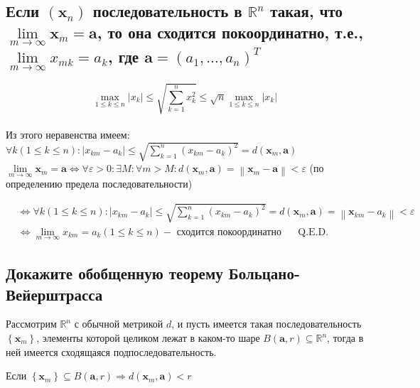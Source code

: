 \documentclass[a4paper]{article}
\begin{document}
\subsection{Если $\left(\mathbf{x}_{n}\right)$ последовательность в $\mathbb{R}^{n}$ такая, что $\lim\limits_{m \rightarrow \infty} \mathbf{x}_{m}=\mathbf{a}$, то она сходится покоординатно, т.е., $\lim\limits_{m \rightarrow \infty} x_{m k}=a_{k}$, где $\mathbf{a}=\left(a_{1}, \ldots, a_{n}\right)^{T}$}

$$\boxed{
\max _{1 \leqslant k \leqslant n}\left|x_{k}\right| \leqslant \sqrt{\sum_{k=1}^{n} x_{k}^{2}} \leqslant \sqrt{n} \max _{1 \leqslant k \leqslant n}\left|x_{k}\right|}$$\\[2mm]
Из этого неравенства имеем: $\forall k(1 \leqslant k \leqslant n):\left|x_{k m}-a_{k}\right| \leqslant \sqrt{\sum_{k=1}^{n}\left(x_{k m}-a_{k}\right)^{2}}=d\left(\mathbf{x}_{m}, \mathbf{a}\right)$\\[2mm]
$\lim\limits_{m \rightarrow \infty} \mathbf{x}_{m}=\mathbf{a} \Longleftrightarrow \forall \varepsilon>0: \exists M: \forall m>M: d\left(\mathbf{x}_{m}, \mathbf{a}\right)=\left\|\mathbf{x}_{m}-\mathbf{a}\right\|<\varepsilon$ (по определению предела последовательности)

$$
\begin{aligned}
& \Longleftrightarrow \forall k(1 \leqslant k \leqslant n):\left|x_{k m}-a_{k}\right| \leqslant \sqrt{\sum_{k=1}^{n}\left(x_{k m}-a_{k}\right)^{2}}=d\left(\mathbf{x}_{m}, \mathbf{a}\right)=\left\|\mathbf{x}_{k m}-a_{k}\right\|<\varepsilon \\
& \Longleftrightarrow \lim\limits_{m \rightarrow \infty} x_{k m}=a_{k}(1 \leqslant k \leqslant n)-\text { сходится покоординатно } \quad \text { Q.E.D. }
\end{aligned}
$$

\subsection{Докажите обобщенную теорему Больцано-Вейерштрасса}

Рассмотрим $\mathbb{R}^{n}$ с обычной метрикой $d$, и пусть имеется такая последовательность $\left\{\mathbf{x}_{m}\right\}$, элементы которой целиком лежат в каком-то шаре $B(\mathbf{a}, r) \subseteq \mathbb{R}^{n}$, тогда в ней имеется сходящаяся подпоследовательность.

Если $\left\{\mathbf{x}_{m}\right\} \subseteq B(\mathbf{a}, r) \Longrightarrow d\left(\mathbf{x}_{m}, \mathbf{a}\right)<r$
\end{document}
